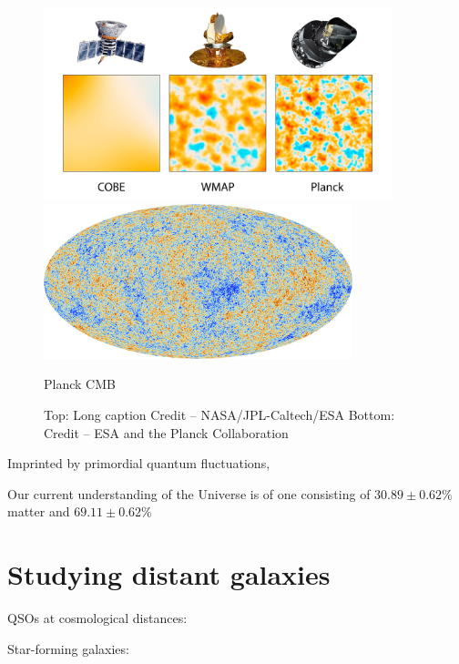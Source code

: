 \begin{figure}[t!]
	\centering
	\label{fig:cmb_comparison}
	\includegraphics[width=0.9\textwidth]{CobeWmapPlanckComparison.jpg}
	
	\vspace{0.5in}
		
	\includegraphics[width=0.8\textwidth]{Planck_CMB.jpg}
	
	{\sffamily Planck CMB}
	
	\caption[Short caption]{Top: Long caption Credit -- NASA/JPL-Caltech/ESA Bottom: Credit -- ESA and the Planck Collaboration}
\end{figure}

Imprinted by primordial quantum fluctuations,


Our current understanding of the Universe is of one consisting of $30.89 \pm 0.62\%$ matter and $69.11 \pm 0.62\%$
\citep{Collaboration:2015tp}

\section[Studying distant galaxies]{Studying distant galaxies}
\label{sec:section1_label}

QSOs at cosmological distances: \citet{Schmidt:1965gm}

Star-forming galaxies: \citep{Partridge:1967iw}

